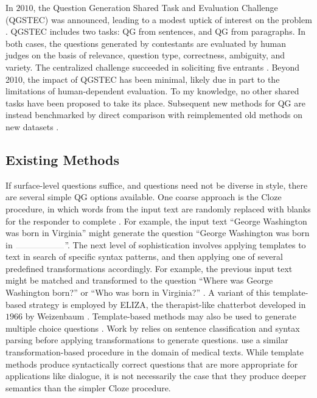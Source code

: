 In $2010$, the Question Generation Shared Task and Evaluation Challenge (QGSTEC) was announced, leading to a modest uptick of interest on the problem \citep{rus2011question}. QGSTEC includes two tasks: QG from sentences, and QG from paragraphs. In both cases, the questions generated by contestants are evaluated by human judges on the basis of relevance, question type, correctness, ambiguity, and variety. The centralized challenge succeeded in soliciting five entrants \citep{ali2010automatic,pal2010qgstec,yao2010question, vargaha, mannem2010question}. Beyond 2010, the impact of QGSTEC has been minimal, likely due in part to the limitations of human-dependent evaluation. To my knowledge, no other shared tasks have been proposed to take its place. Subsequent new methods for QG are instead benchmarked by direct comparison with reimplemented old methods on new datasets \citep{1603.06807}.

\subsection{Existing Methods}

If surface-level questions suffice, and questions need not be diverse in style, there are several simple QG options available. One coarse approach is the Cloze procedure, in which words from the input text are randomly replaced with blanks for the responder to complete \citep{taylor1953cloze}. For example, the input text ``George Washington was born in Virginia'' might generate the question ``George Washington was born in $\rule{2cm}{0.05mm}$''. The next level of sophistication involves applying templates to text in search of specific syntax patterns, and then applying one of several predefined transformations accordingly. For example, the previous input text might be matched and transformed to the question ``Where was George Washington born?'' or ``Who was born in Virginia?'' \citep{gates2008automatically, kunichika2004automated, heilman2011automatic}. A variant of this template-based strategy is employed by ELIZA, the therapist-like chatterbot developed in $1966$ by Weizenbaum \citep{weizenbaum1966eliza}. Template-based methods may also be used to generate multiple choice questions \citep{mitkov2006computer}. Work by \citet{ali2010automatic} relies on sentence classification and syntax parsing before applying transformations to generate questions.  \citet{wang2007automatic} use a similar transformation-based procedure in the domain of medical texts. While template methods produce syntactically correct questions that are more appropriate for applications like dialogue, it is not necessarily the case that they produce deeper semantics than the simpler Cloze procedure.

